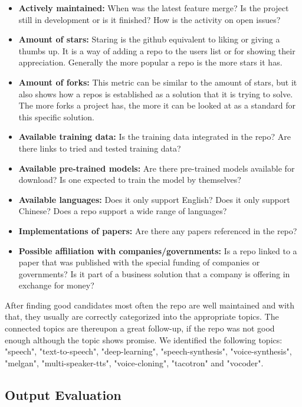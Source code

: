 \begin{itemize}
    \item \textbf{Actively maintained:} When was the latest feature merge? Is the project still in development or is it finished? How is the activity on open issues?
    \item \textbf{Amount of stars:} Staring is the github equivalent to liking or giving a thumbs up. It is a way of adding a \gls{repo} to the users list or for showing their appreciation. Generally the more popular a \gls{repo} is the more stars it has.
    \item \textbf{Amount of forks:} This metric can be similar to the amount of stars, but it also shows how a \gls{repo}s is established as a solution that it is trying to solve. The more forks a project has, the more it can be looked at as a standard for this specific solution.
    \item \textbf{Available training data:} Is the training data integrated in the \gls{repo}? Are there links to tried and tested training data?
    \item \textbf{Available pre-trained models:} Are there pre-trained models available for download? Is one expected to train the model by themselves?
    \item \textbf{Available languages:} Does it only support English? Does it only support Chinese? Does a \gls{repo} support a wide range of languages?
    \item \textbf{Implementations of papers:} Are there any papers referenced in the \gls{repo}?
    \item \textbf{Possible affiliation with companies/governments:} Is a \gls{repo} linked to a paper that was published with the special funding of companies or governments? Is it part of a business solution that a company is offering in exchange for money?
\end{itemize}

After finding good candidates most often the \gls{repo} are well maintained and with that, they usually are correctly categorized into the appropriate topics. The connected topics are thereupon a great follow-up, if the \gls{repo} was not good enough although the topic shows promise. We identified the following topics: "speech", "text-to-speech", "deep-learning", "speech-synthesis", "voice-synthesis", "melgan", "multi-speaker-tts", "voice-cloning", "tacotron" and "vocoder".

\subsection{Output Evaluation} \label{eval_method}


